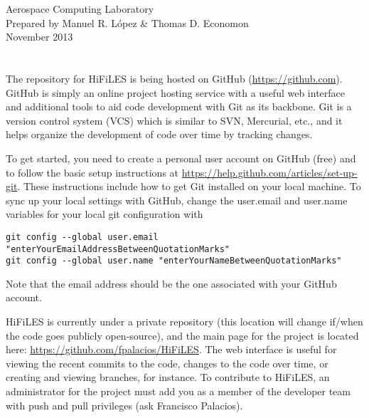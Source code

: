 \documentclass[letter,10pt]{article}
\title{\TitleFont{\vspace{-1cm}\bf{HiFiLES Quick Reference Guide \vspace{-2cm}}}}
\date{}
\newcommand*{\TitleFont}{%
      \usefont{\encodingdefault}{\rmdefault}{b}{n}%
      \fontsize{10}{20}%
      \selectfont}
\begin{document}
\begin{flushleft}
Aerospace Computing Laboratory\\
Prepared by Manuel R. L\'opez \& Thomas D. Economon\\
November 2013
\end{flushleft}

\begingroup
\let\newpage\relax%
\let\date\relax
\let\author\relax
\maketitle
\endgroup
{}

\section*{\TitleFont{Developing HiFiLES through Git + GitHub}}

The repository for HiFiLES is being hosted on GitHub (\url{https://github.com}). GitHub is simply an online project hosting service with a useful web interface and additional tools to aid code development with Git as its backbone. Git is a version control system (VCS) which is similar to SVN, Mercurial, etc., and it helps organize the development of code over time by tracking changes. 

To get started, you need to create a personal user account on GitHub (free) and to follow the basic setup instructions at
\url{https://help.github.com/articles/set-up-git}. These instructions include how to get Git installed on your local machine. To sync up your local settings with GitHub, change the user.email and user.name variables for your local git configuration with
\begin{verbatim}git config --global user.email "enterYourEmailAddressBetweenQuotationMarks" 
git config --global user.name "enterYourNameBetweenQuotationMarks"
\end{verbatim}
Note that the email address should be the one associated with your GitHub account.

HiFiLES is currently under a private repository (this location will change if/when the code goes publicly open-source), and the main page for the project is located here: \url{https://github.com/fpalacios/HiFiLES}. The web interface is useful for viewing the recent commits to the code, changes to the code over time, or creating and viewing branches, for instance. To contribute to HiFiLES, an administrator for the project must add you as a member of the developer team with push and pull privileges (ask Francisco Palacios). 
\end{document}

